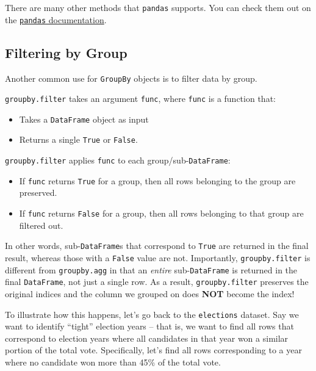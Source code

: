 \documentclass[
  letterpaper,
  DIV=11,
  numbers=noendperiod]{scrreprt}
\providecommand{\tightlist}{%
  \setlength{\itemsep}{0pt}\setlength{\parskip}{0pt}}\usepackage{longtable,booktabs,array}
\begin{document}
There are many other methods that \texttt{pandas} supports. You can
check them out on the
\href{https://pandas.pydata.org/docs/reference/groupby.html}{\texttt{pandas}
documentation}.

\hypertarget{filtering-by-group}{%
\subsection{Filtering by Group}\label{filtering-by-group}}

Another common use for \texttt{GroupBy} objects is to filter data by
group.

\texttt{groupby.filter} takes an argument \texttt{func}, where
\texttt{func} is a function that:

\begin{itemize}
\tightlist
\item
  Takes a \texttt{DataFrame} object as input
\item
  Returns a single \texttt{True} or \texttt{False}.
\end{itemize}

\texttt{groupby.filter} applies \texttt{func} to each
group/sub-\texttt{DataFrame}:

\begin{itemize}
\tightlist
\item
  If \texttt{func} returns \texttt{True} for a group, then all rows
  belonging to the group are preserved.
\item
  If \texttt{func} returns \texttt{False} for a group, then all rows
  belonging to that group are filtered out.
\end{itemize}

In other words, sub-\texttt{DataFrame}s that correspond to \texttt{True}
are returned in the final result, whereas those with a \texttt{False}
value are not. Importantly, \texttt{groupby.filter} is different from
\texttt{groupby.agg} in that an \emph{entire} sub-\texttt{DataFrame} is
returned in the final \texttt{DataFrame}, not just a single row. As a
result, \texttt{groupby.filter} preserves the original indices and the
column we grouped on does \textbf{NOT} become the index!

To illustrate how this happens, let's go back to the \texttt{elections}
dataset. Say we want to identify ``tight'' election years -- that is, we
want to find all rows that correspond to election years where all
candidates in that year won a similar portion of the total vote.
Specifically, let's find all rows corresponding to a year where no
candidate won more than 45\% of the total vote.
\end{document}
